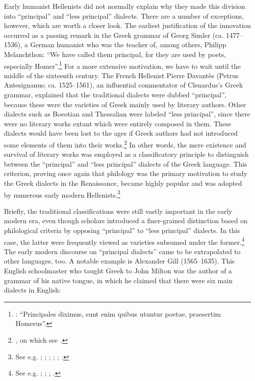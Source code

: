 Early humanist Hellenists did not normally explain why they made this division into “principal” and “less principal” dialects. There are a number of exceptions, however, which are worth a closer look. The earliest justification of the innovation occurred as a passing remark in the Greek grammar of Georg Simler (ca. 1477–1536), a German humanist who was the teacher of, among others, Philipp Melanchthon: “We have called them principal, for they are used by poets, especially Homer”.\footnote{\citet[\textsc{aa.}i\textsc{\textsuperscript{r}}]{Simler1512}: “Principales diximus, sunt enim quibus utuntur poetae, praesertim Homerus”.} For a more extensive motivation, we have to wait until the middle of the sixteenth century. The French Hellenist Pierre Davantès (Petrus Antesignanus; ca. 1525–1561), an influential commentator of Clenardus’s Greek grammar, explained that the traditional dialects were dubbed “principal”, because these were the varieties of Greek mainly used by literary authors. Other dialects such as Boeotian and Thessalian were labeled “less principal”, since there were no literary works extant which were entirely composed in them. These dialects would have been lost to the ages if Greek authors had not introduced some elements of them into their works.\footnote{\citet[11]{Antesignanus1554}, on which see \citet[129--130]{VanRooy2016c}.} In other words, the mere existence and survival of literary works was employed as a classificatory principle to distinguish between the “principal” and “less principal” dialects of the Greek language. This criterion, proving once again that philology was the primary motivation to study the Greek dialects in the Renaissance, became highly popular and was adopted by numerous early modern Hellenists.\footnote{See e.g. \citet[2--3]{Walper1589}; \citet[7--8]{Schmidt1604}; \citet[3--4]{Merigon1621}; \citet[83--84]{Rhenius1626}; \citet[66]{Busby1696};  \citet[1132–1133]{[frisch]1730}.}

Briefly, the traditional classifications were still vastly important in the early modern era, even though scholars introduced a finer-grained distinction based on philological criteria by opposing “principal” to “less principal” dialects. In this case, the latter were frequently viewed as varieties subsumed under the former.\footnote{See e.g. \citet[a.3\textsc{\textsuperscript{v}}]{Canini1555}; \citet[439]{Saumaise1643a}; \citet[2–3, 7–9]{Munthe1748}; \citet[490--491]{Valckenaer1790}.} The early modern discourse on “principal dialects” came to be extrapolated to other languages, too. A notable example is Alexander Gill (1565–1635). This English schoolmaster who taught Greek to John Milton was the author of a grammar of his native tongue, in which he claimed that there were six main dialects in English:

